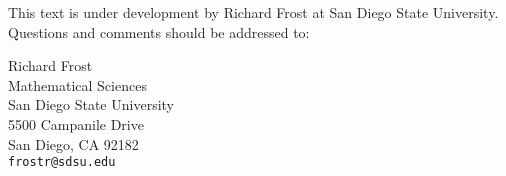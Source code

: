 
This text is under development by 
Richard Frost at San Diego State University.  Questions
and comments should be addressed to:

Richard Frost   \\
Mathematical Sciences \\
San Diego State University \\
5500 Campanile Drive \\
San Diego, CA 92182 \\
\verb|frostr@sdsu.edu|

\vfill
\fbox{\parbox{5.8 in}{}}

